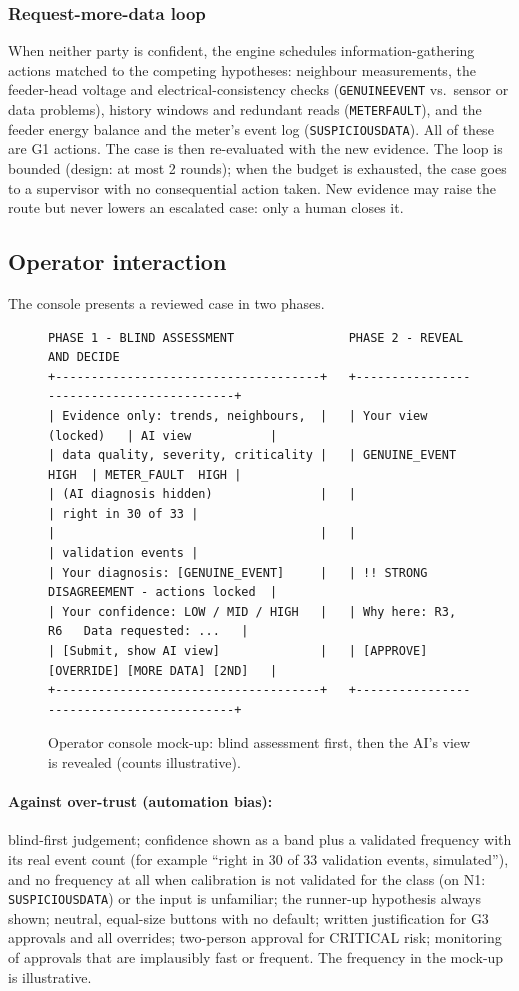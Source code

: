 \documentclass[11pt,a4paper]{article}
\renewcommand{\_}{\textunderscore\allowbreak}
\providecommand{\GE}{\texttt{GENUINE\_EVENT}}
\providecommand{\MF}{\texttt{METER\_FAULT}}
\providecommand{\SD}{\texttt{SUSPICIOUS\_DATA}}
\newcommand{\lvl}[1]{\textsf{#1}}
\begin{document}
\subsubsection{Request-more-data loop}
When neither party is confident, the engine schedules information-gathering actions matched to the competing
hypotheses: neighbour measurements, the feeder-head voltage and electrical-consistency checks (\GE{} vs.\
sensor or data problems), history windows and redundant reads (\MF), and the feeder energy balance and the
meter's event log (\SD). All of these are \lvl{G1} actions. The case is then re-evaluated with the new
evidence. The loop is bounded (design: at most 2 rounds); when the budget is exhausted, the case goes to
a supervisor with no consequential action taken. New evidence may raise the route but never lowers an
escalated case: only a human closes it.

\subsection{Operator interaction}
The console presents a reviewed case in two phases.

\begin{figure}[htbp]
\centering
\begin{lstlisting}[basicstyle=\ttfamily\scriptsize,breaklines=false]
PHASE 1 - BLIND ASSESSMENT                PHASE 2 - REVEAL AND DECIDE
+-------------------------------------+   +------------------------------------------+
| Evidence only: trends, neighbours,  |   | Your view (locked)   | AI view           |
| data quality, severity, criticality |   | GENUINE_EVENT  HIGH  | METER_FAULT  HIGH |
| (AI diagnosis hidden)               |   |                      | right in 30 of 33 |
|                                     |   |                      | validation events |
| Your diagnosis: [GENUINE_EVENT]     |   | !! STRONG DISAGREEMENT - actions locked  |
| Your confidence: LOW / MID / HIGH   |   | Why here: R3, R6   Data requested: ...   |
| [Submit, show AI view]              |   | [APPROVE] [OVERRIDE] [MORE DATA] [2ND]   |
+-------------------------------------+   +------------------------------------------+
\end{lstlisting}
\caption{Operator console mock-up: blind assessment first, then the AI's view is revealed (counts illustrative).}
\label{fig:console}
\end{figure}

\paragraph{Against over-trust (automation bias):} blind-first judgement; confidence shown as a band plus a
validated frequency with its real event count (for example ``right in 30 of 33 validation events, simulated''),
and no frequency at all when calibration is not validated for the class (on N1: \SD) or the input is
unfamiliar; the runner-up hypothesis always shown; neutral, equal-size buttons with no default; written
justification for \lvl{G3} approvals and all overrides; two-person approval for CRITICAL risk; monitoring of
approvals that are implausibly fast or frequent. The frequency in the mock-up is illustrative.
\end{document}
